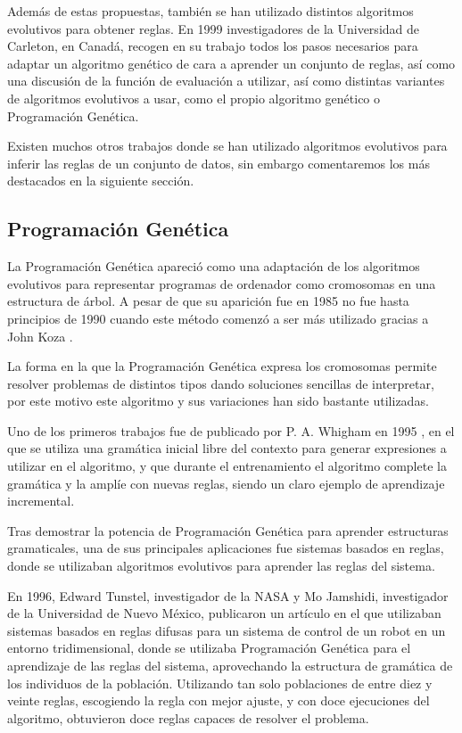 Además de estas propuestas, también se han utilizado distintos algoritmos evolutivos para obtener reglas. En 1999 investigadores de la Universidad de Carleton, en Canadá, recogen en su trabajo \cite{reglasUsandoGeneticos} todos los pasos necesarios para adaptar un algoritmo genético de cara a aprender un conjunto de reglas, así como una discusión de la función de evaluación a utilizar, así como distintas variantes de algoritmos evolutivos a usar, como el propio algoritmo genético o Programación Genética.

Existen muchos otros trabajos donde se han utilizado algoritmos evolutivos para inferir las reglas de un conjunto de datos, sin embargo comentaremos los más destacados en la siguiente sección.

\subsection{Programación Genética}

La Programación Genética apareció como una adaptación de los algoritmos evolutivos para representar programas de ordenador como cromosomas en una estructura de árbol. A pesar de que su aparición fue en 1985 no fue hasta principios de 1990 cuando este método comenzó a ser más utilizado gracias a John Koza \cite{kozaGP}.

La forma en la que la Programación Genética expresa los cromosomas permite resolver problemas de distintos tipos dando soluciones sencillas de interpretar, por este motivo este algoritmo y sus variaciones han sido bastante utilizadas.

Uno de los primeros trabajos fue de publicado por P. A. Whigham en 1995 \cite{PGgramaticas}, en el que se utiliza una gramática inicial libre del contexto para generar expresiones a utilizar en el algoritmo, y que durante el entrenamiento el algoritmo complete la gramática y la amplíe con nuevas reglas, siendo un claro ejemplo de aprendizaje incremental.

Tras demostrar la potencia de Programación Genética para aprender estructuras gramaticales, una de sus principales aplicaciones fue sistemas basados en reglas, donde se utilizaban algoritmos evolutivos para aprender las reglas del sistema.

En 1996, Edward Tunstel, investigador de la NASA y Mo Jamshidi, investigador de la Universidad de Nuevo México, publicaron un artículo \cite{PGcontrolRobots} en el que utilizaban sistemas basados en reglas difusas para un sistema de control de un robot en un entorno tridimensional, donde se utilizaba Programación Genética para el aprendizaje de las reglas del sistema, aprovechando la estructura de gramática de los individuos de la población. Utilizando tan solo poblaciones de entre diez y veinte reglas, escogiendo la regla con mejor ajuste, y con doce ejecuciones del algoritmo, obtuvieron doce reglas capaces de resolver el problema.

